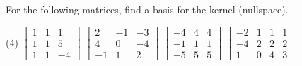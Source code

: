 \begin{exercise}
\pagebreak[2]
For the following matrices, find a basis for the kernel (nullspace).
\begin{tasks}(4)
\task
$\begin{bmatrix}
1 & 1 & 1 \\
1 & 1 & 5 \\
1 & 1 & -4
\end{bmatrix}$
\task
$\begin{bmatrix}
2 & -1 & -3 \\
4 & 0 & -4 \\
-1 & 1 & 2
\end{bmatrix}$
\task
$\begin{bmatrix}
-4 & 4 & 4 \\
-1 & 1 & 1 \\
-5 & 5 & 5
\end{bmatrix}$
\task
$\begin{bmatrix}
-2 & 1 & 1 & 1 \\
-4 & 2 & 2 & 2 \\
1 & 0 & 4 & 3
\end{bmatrix}$
\end{tasks}
\end{exercise}

